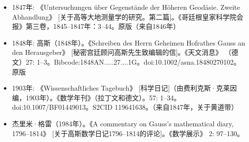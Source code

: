 \begin{itemize}
\item 1847年: 《Untersuchungen über Gegenstände der Höheren Geodäsie. Zweite Abhandlung》 [关于高等大地测量学的研究。第二篇]。《哥廷根皇家科学院会报》第三卷，1845–1847年：3–44。原版（来自1846年）
\item 1848年: 高斯（1848年）。《Schreiben des Herrn Geheimen Hofrathes Gauss an den Herausgeber》 [秘密宫廷顾问高斯先生致编辑的信]。《天文消息》 （德文）27: 1–3。Bibcode:1848AN.....27....1G。doi:10.1002/asna.18480270102。原版
\item 1903年: 《Wissenschaftliches Tagebuch》 [科学日记]（由费利克斯·克莱因编，1903年）。《数学年刊》（拉丁文和德文）。57: 1–34。doi:10.1007/BF01449013。S2CID 119641638。（来自1847年，关于黄道带）
\item 杰里米·格雷（1984年）。《A commentary on Gauss's mathematical diary, 1796–1814》 [关于高斯数学日记1796–1814的评论]。《数学展示》 2: 97–130。
\end{itemize}
